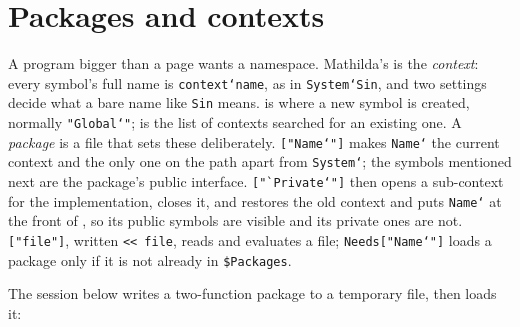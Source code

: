 \section{Packages and contexts}
\label{sec:prog-packages}

A program bigger than a page wants a namespace. Mathilda's is the \emph{context}:
every symbol's full name is \texttt{context`name}, as in \texttt{System`Sin}, and
two settings decide what a bare name like \texttt{Sin} means.
 is where a new symbol is created, normally \texttt{"Global`"};
 is the list of contexts searched for an existing
one. A \emph{package} is a file that sets these
deliberately. \texttt{["Name`"]} makes \texttt{Name`} the current
context and the only one on the path apart from \texttt{System`}; the symbols
mentioned next are the package's public interface. \texttt{["`Private`"]}
then opens a sub-context for the implementation,  closes it, and
 restores the old context and puts \texttt{Name`} at the front of
, so its public symbols are visible and its private ones are not.
\texttt{["file"]}, written \texttt{<< file}, reads and evaluates a file;
\texttt{Needs["Name`"]} loads a package only if it is not already in
\texttt{\$Packages}.

The session below writes a two-function package to a temporary file, then loads it:

